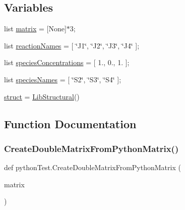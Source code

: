 \subsection*{Variables}
\begin{DoxyCompactItemize}
\item 
list \hyperlink{namespacepython_test_a729fc15cc8ffbf8745dd4b7476e8324a}{matrix} = \mbox{[}None\mbox{]}$\ast$3;
\item 
list \hyperlink{namespacepython_test_a004f052ba812c8e03bbab159cd7d3b75}{reaction\+Names} = \mbox{[} \char`\"{}J1\char`\"{}, \char`\"{}J2\char`\"{}, \char`\"{}J3\char`\"{}, \char`\"{}J4\char`\"{} \mbox{]};
\item 
list \hyperlink{namespacepython_test_ad7229d8301e65692ae21c96d99b3a43f}{species\+Concentrations} = \mbox{[} 1., 0., 1. \mbox{]};
\item 
list \hyperlink{namespacepython_test_a0a8e8643e0a24523d16aa025aa13df5c}{species\+Names} = \mbox{[} \char`\"{}S2\char`\"{}, \char`\"{}S3\char`\"{}, \char`\"{}S4\char`\"{} \mbox{]};
\item 
\hyperlink{namespacepython_test_ac673393a25db52d0a3bdc27bbbd13135}{struct} = \hyperlink{classstructural_1_1_lib_structural}{Lib\+Structural}()
\end{DoxyCompactItemize}


\subsection{Function Documentation}
\mbox{\label{namespacepython_test_ae083050f937070378e6de4f5a3e20526}} 
\subsubsection{\texorpdfstring{Create\+Double\+Matrix\+From\+Python\+Matrix()}{CreateDoubleMatrixFromPythonMatrix()}}
{\footnotesize\ttfamily def python\+Test.\+Create\+Double\+Matrix\+From\+Python\+Matrix (\begin{DoxyParamCaption}\item[{}]{matrix }\end{DoxyParamCaption})}

\mbox{\label{namespacepython_test_a10f69eede98349a1899063520eb59eb7}} 
